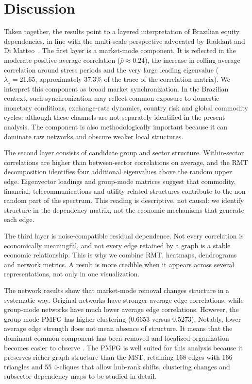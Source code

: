 \section{Discussion}
\label{sec:discussion}

Taken together, the results point to a layered interpretation of Brazilian equity dependencies, in line with the multi-scale perspective advocated by Raddant and Di Matteo~\cite{raddant_dimatteo_2023}. The first layer is a market-mode component. It is reflected in the moderate positive average correlation ($\bar{\rho}\approx0.24$), the increase in rolling average correlation around stress periods and the very large leading eigenvalue ($\lambda_1=21.65$, approximately 37.3\% of the trace of the correlation matrix). We interpret this component as broad market synchronization. In the Brazilian context, such synchronization may reflect common exposure to domestic monetary conditions, exchange-rate dynamics, country risk and global commodity cycles, although these channels are not separately identified in the present analysis. The component is also methodologically important because it can dominate raw networks and obscure weaker local structures.

The second layer consists of candidate group and sector structure. Within-sector correlations are higher than between-sector correlations on average, and the RMT decomposition identifies four additional eigenvalues above the random upper edge. Eigenvector loadings and group-mode matrices suggest that commodity, financial, telecommunications and utility-related structures contribute to the non-random part of the spectrum. This reading is descriptive, not causal: we identify structure in the dependency matrix, not the economic mechanisms that generate each edge.

The third layer is noise-compatible residual dependence. Not every correlation is economically meaningful, and not every edge retained by a graph is a stable economic relationship. This is why we combine RMT, heatmaps, dendrograms and network metrics. A result is more credible when it appears across several representations, not only in one visualization.

The network results show that market-mode removal changes structure in a systematic way. Original networks have stronger average edge correlations, while group-mode networks have much lower average edge correlations. However, the group-mode PMFG has higher clustering (0.6653 versus 0.5273). Notably, lower average edge strength does not mean absence of structure. It means that the dominant common component has been removed and localized organization becomes easier to observe \cite{tumminello_2005_tool,tumminello_2010_correlation}. The PMFG is well suited for this analysis because it preserves richer graph structure than the MST, retaining 168 edges with 166 triangles and 55 4-cliques that allow hub-rank shifts, clustering changes and subsector dependency maps to be studied in detail.

